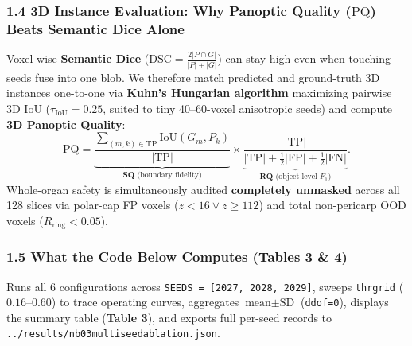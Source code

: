 \documentclass[10pt,a4paper]{article}
\renewcommand{\_}{\origunderscore\allowbreak}
\begin{document}
\subsubsection*{1.4 3D Instance Evaluation: Why Panoptic Quality ($\text{PQ}$) Beats Semantic Dice Alone}
Voxel-wise \textbf{Semantic Dice} ($\text{DSC} = \frac{2|P \cap G|}{|P| + |G|}$) can stay high even when touching seeds fuse into one blob. We therefore match predicted and ground-truth 3D instances one-to-one via \textbf{Kuhn's Hungarian algorithm} maximizing pairwise 3D IoU ($\tau_{\text{IoU}} = 0.25$, suited to tiny 40--60-voxel anisotropic seeds) and compute \textbf{3D Panoptic Quality}:
\[
\text{PQ} = \underbrace{\frac{\sum_{(m,k) \in \text{TP}} \text{IoU}(G_m, P_k)}{|\text{TP}|}}_{\textbf{SQ}\text{ (boundary fidelity)}} \times \underbrace{\frac{|\text{TP}|}{|\text{TP}| + \frac{1}{2}|\text{FP}| + \frac{1}{2}|\text{FN}|}}_{\textbf{RQ}\text{ (object-level } F_1\text{)}}.
\]
Whole-organ safety is simultaneously audited \textbf{completely unmasked} across all 128 slices via polar-cap FP voxels ($z < 16 \lor z \ge 112$) and total non-pericarp OOD voxels ($R_{\text{ring}} < 0.05$).

\subsubsection*{1.5 What the Code Below Computes (Tables 3 \& 4)}
Runs all 6 configurations across \texttt{SEEDS = [2027, 2028, 2029]}, sweeps \texttt{thr\_grid} ($0.16$--$0.60$) to trace operating curves, aggregates $\text{mean} \pm \text{SD}$ (\texttt{ddof=0}), displays the summary table (\textbf{Table 3}), and exports full per-seed records to \texttt{../\allowbreak{}results/\allowbreak{}nb03\_multiseed\_ablation.json}.
\end{document}
